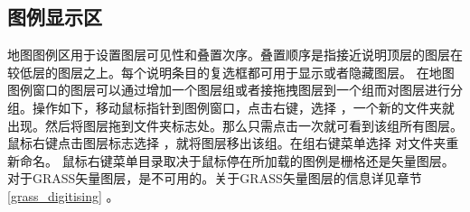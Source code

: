 \subsection{图例显示区}\label{label_legend}

地图图例区用于设置图层可见性和叠置次序。叠置顺序是指接近说明顶层的图层在较低层的图层之上。每个说明条目的复选框都可用于显示或者隐藏图层。
在地图图例窗口的图层可以通过增加一个图层组或者接拖拽图层到一个组而对图层进行分组。操作如下，移动鼠标指针到图例窗口，点击右键，选择  ，一个新的文件夹就出现。然后将图层拖到文件夹标志处。那么只需点击一次就可看到该组所有图层。鼠标右键点击图层标志选择  ，就将图层移出该组。在组右键菜单选择  对文件夹重新命名。
鼠标右键菜单目录取决于鼠标停在所加载的图例是栅格还是矢量图层。对于GRASS矢量图层，是不可用的。关于GRASS矢量图层的信息详见章节 \ref{grass_digitising} 。

